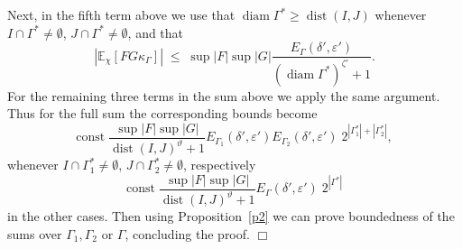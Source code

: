 \documentclass[a4paper,11pt]{article}
\newenvironment{proof}[1][Proof]{{\sc #1.} }{\hfill $\Box$}
\newcommand{\dist}{\mathop{\mathrm{dist}}\nolimits}
\newcommand{\eps}{\varepsilon}
\newcommand{\diam}{\mathop{\mathrm{diam}}\nolimits}
\newcommand {\Ga} {\ensuremath{\Gamma}}
\begin{document}
\begin{proof}
Next, in the fifth term above we use that $\diam \Ga^* \geq \dist(I,J)$ 
whenever $I \cap \Ga^* \neq \emptyset$, $J \cap \Ga^* \neq \emptyset$, 
and that
\begin{equation}
|\mathbb{E}_{\chi} [F G \kappa_\Ga]| \; \leq \; \sup|F| \sup|G| 
\frac{E_\Ga(\delta',\eps')} {(\diam \Ga^*)^{\zeta'} + 1}.
\end{equation}
For the remaining three terms in the sum above we apply the same argument. 
Thus for the full sum the corresponding bounds become
\begin{equation}
\mbox{const} \; \frac{\sup|F| \sup|G|}{\dist(I,J)^\vartheta + 1} 
E_{\Ga_1}(\delta',\eps') 
E_{\Ga_2}(\delta',\eps') \; 2^{|\Ga_1^*| + |\Ga^*_2|}, 
\end{equation}
whenever $I \cap \Ga^*_1 \neq \emptyset$, $J \cap \Ga^*_2 \neq \emptyset$, 
respectively 
\begin{equation}
\mbox{const} \; \frac{\sup|F| \sup|G|}{\dist(I,J)^\vartheta + 1} 
E_{\Ga}(\delta',\eps') \; 2^{|\Ga^*|} 
\end{equation}
in the other cases. Then using  Proposition~\ref{p2} we can prove 
boundedness of the sums over  $\Ga_1, \Ga_2$ or $\Ga$, concluding the 
proof.
\end{proof}
\end{document}
